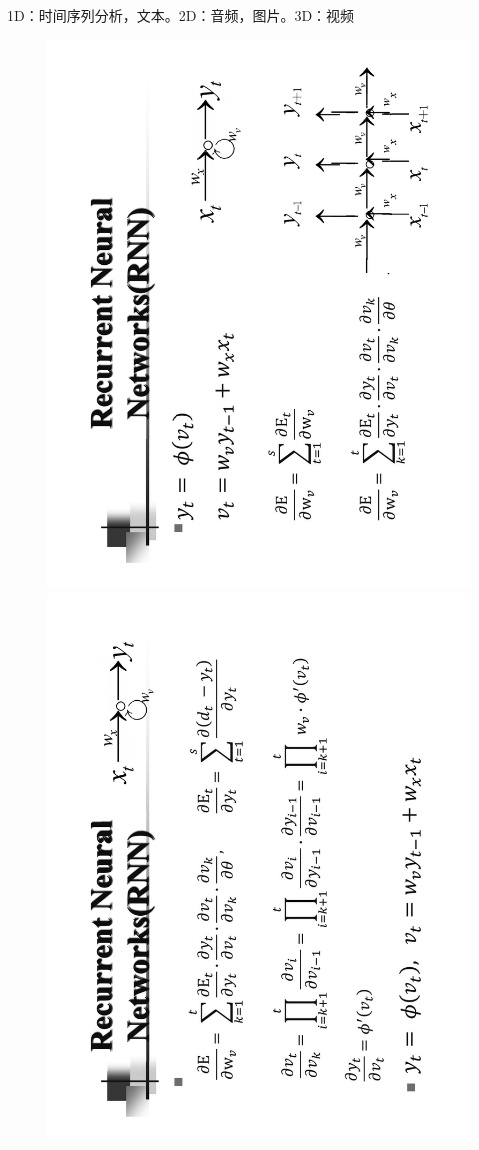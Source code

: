 \documentclass[UTF8,a4paper,landscape,16pt]{paper}
\begin{document}
\begin{multicols}{4}
\noindent 1D：时间序列分析，文本。2D：音频，图片。3D：视频
\begin{figure}[H]
\centering\includegraphics[height=\columnwidth,angle = -90]{NN/12.pdf}
\includegraphics[height=\columnwidth,angle = -90]{NN/13.pdf}

\end{figure}
\end{multicols}
\end{document}
